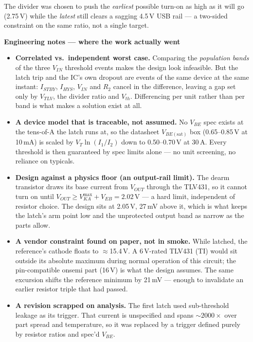 \documentclass[10pt]{article}
\newcommand{\hd}[1]{\vspace{2pt}\textbf{\large #1}\vspace{1pt}\\}
\begin{document}
\vspace{-3pt}
The divider was chosen to push the \emph{earliest} possible turn-on as high as
it will go (2.75\,V) while the \emph{latest} still clears a sagging 4.5\,V USB
rail --- a two-sided constraint on the same ratio, not a single target.

\hd{Engineering notes --- where the work actually went}
\begin{itemize}[leftmargin=1.1em,itemsep=2pt,topsep=1pt]
\item \textbf{Correlated vs.\ independent worst case.} Comparing the
  \emph{population bands} of the three $V_{IN}$ threshold events makes the
  design look infeasible. But the latch trip and the IC's own dropout are
  events of the same device at the same instant: $I_{STBY}$, $I_{HYS}$,
  $V_{IN}$ and $R_2$ cancel in the difference, leaving a gap set only by
  $V_{TLV}$, the divider ratio and $V_{th}$. Differencing per unit rather than
  per band is what makes a solution exist at all.
\item \textbf{A device model that is traceable, not assumed.} No $V_{BE}$ spec
  exists at the tens-of-\textmu A the latch runs at, so the datasheet
  $V_{BE(\mathrm{sat})}$ box (0.65--0.85\,V at 10\,mA) is scaled by
  $V_T\ln(I_1/I_2)$ down to 0.50--0.70\,V at 30\,\textmu A. Every threshold is
  then guaranteed by spec limits alone --- no unit screening, no reliance on
  typicals.
\item \textbf{Design against a physics floor (an output-rail limit).} The dearm
  transistor draws its base current from $V_{OUT}$ through the TLV431, so it
  cannot turn on until $V_{OUT}\ge V_{KA}^{\max}+V_{EB}=2.02$\,V --- a hard
  limit, independent of resistor choice. The design sits at 2.05\,V, 27\,mV
  above it, which is what keeps the latch's arm point low and the unprotected
  output band as narrow as the parts allow.
\item \textbf{A vendor constraint found on paper, not in smoke.} While latched,
  the reference's cathode floats to $\approx$15.4\,V. A 6\,V-rated TLV431 (TI)
  would sit outside its absolute maximum during normal operation of this
  circuit; the pin-compatible onsemi part (16\,V) is what the design assumes.
  The same excursion shifts the reference minimum by 21\,mV --- enough to
  invalidate an earlier resistor triple that had passed.
\item \textbf{A revision scrapped on analysis.} The first latch used
  sub-threshold leakage as its trigger. That current is unspecified and spans
  $\sim2000\times$ over part spread and temperature, so it was replaced by a
  trigger defined purely by resistor ratios and spec'd $V_{BE}$.
\end{itemize}
\end{document}
